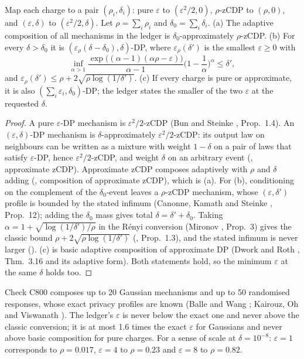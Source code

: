 \setcounter{proposition}{799}
\begin{proposition}\label{prop:ledger}
Map each charge to a pair $(\rho_i,\delta_i)$: pure $\varepsilon$ to $(\varepsilon^2/2,0)$, $\rho$-zCDP to $(\rho,0)$, and $(\varepsilon,\delta)$ to $(\varepsilon^2/2,\delta)$. Let $\rho=\sum_i\rho_i$ and $\delta_0=\sum_i\delta_i$.
(a) The adaptive composition of all mechanisms in the ledger is $\delta_0$-approximately $\rho$-zCDP.
(b) For every $\delta>\delta_0$ it is $(\varepsilon_\rho(\delta-\delta_0),\delta)$-DP, where $\varepsilon_\rho(\delta')$ is the smallest $\varepsilon\ge0$ with
\[\inf_{\alpha>1}\frac{\exp\big((\alpha-1)(\alpha\rho-\varepsilon)\big)}{\alpha-1}\Big(1-\frac1\alpha\Big)^{\alpha}\le\delta',\]
and $\varepsilon_\rho(\delta')\le\rho+2\sqrt{\rho\log(1/\delta')}$.
(c) If every charge is pure or approximate, it is also $(\sum_i\varepsilon_i,\delta_0)$-DP; the ledger states the smaller of the two $\varepsilon$ at the requested $\delta$.
\end{proposition}
\begin{proof}
A pure $\varepsilon$-DP mechanism is $\varepsilon^2/2$-zCDP (Bun and Steinke \cite{bun2016}, Prop.~1.4). An $(\varepsilon,\delta)$-DP mechanism is $\delta$-approximately $\varepsilon^2/2$-zCDP: its output law on neighbours can be written as a mixture with weight $1-\delta$ on a pair of laws that satisfy $\varepsilon$-DP, hence $\varepsilon^2/2$-zCDP, and weight $\delta$ on an arbitrary event (\cite{bun2016}, approximate zCDP). Approximate zCDP composes adaptively with $\rho$ and $\delta$ adding (\cite{bun2016}, composition of approximate zCDP), which is (a). For (b), conditioning on the complement of the $\delta_0$-event leaves a $\rho$-zCDP mechanism, whose $(\varepsilon,\delta')$ profile is bounded by the stated infimum (Canonne, Kamath and Steinke \cite{cks2020}, Prop.~12); adding the $\delta_0$ mass gives total $\delta=\delta'+\delta_0$. Taking $\alpha=1+\sqrt{\log(1/\delta')/\rho}$ in the R\'enyi conversion (Mironov \cite{mironov2017}, Prop.~3) gives the classic bound $\rho+2\sqrt{\rho\log(1/\delta')}$ (\cite{bun2016}, Prop.~1.3), and the stated infimum is never larger (\cite{cks2020}). (c) is basic adaptive composition of approximate DP (Dwork and Roth \cite{dworkroth2014}, Thm.~3.16 and its adaptive form). Both statements hold, so the minimum $\varepsilon$ at the same $\delta$ holds too.
\end{proof}
\noindent Check C800 composes up to 20 Gaussian mechanisms and up to 50 randomised responses, whose exact privacy profiles are known (Balle and Wang \cite{ballewang2018}; Kairouz, Oh and Viswanath \cite{kairouz2015}). The ledger's $\varepsilon$ is never below the exact one and never above the classic conversion; it is at most 1.6 times the exact $\varepsilon$ for Gaussians and never above basic composition for pure charges. For a sense of scale at $\delta=10^{-8}$: $\varepsilon=1$ corresponds to $\rho=0.017$, $\varepsilon=4$ to $\rho=0.23$ and $\varepsilon=8$ to $\rho=0.82$.

